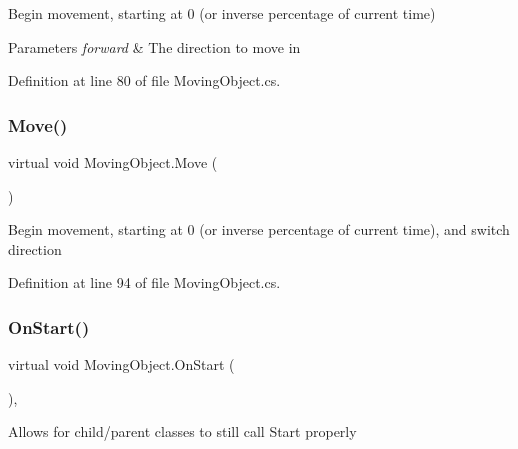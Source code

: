 Begin movement, starting at 0 (or inverse percentage of current time) 


\begin{DoxyParams}{Parameters}
{\em forward} & The direction to move in\\
\hline
\end{DoxyParams}


Definition at line 80 of file Moving\+Object.\+cs.

\mbox{\label{class_moving_object_aebfe91fa850bfb3daecb1475f14fdbb0}} 
\subsubsection{\texorpdfstring{Move()}{Move()}\hspace{0.1cm}{\footnotesize\ttfamily [2/2]}}
{\footnotesize\ttfamily virtual void Moving\+Object.\+Move (\begin{DoxyParamCaption}{ }\end{DoxyParamCaption})\hspace{0.3cm}{\ttfamily [virtual]}}



Begin movement, starting at 0 (or inverse percentage of current time), and switch direction 



Definition at line 94 of file Moving\+Object.\+cs.

\mbox{\label{class_moving_object_a17c2c8f8e720dc68bf25c0abc59bf5f9}} 
\subsubsection{\texorpdfstring{On\+Start()}{OnStart()}}
{\footnotesize\ttfamily virtual void Moving\+Object.\+On\+Start (\begin{DoxyParamCaption}{ }\end{DoxyParamCaption})\hspace{0.3cm}{\ttfamily [protected]}, {\ttfamily [virtual]}}



Allows for child/parent classes to still call Start properly 




